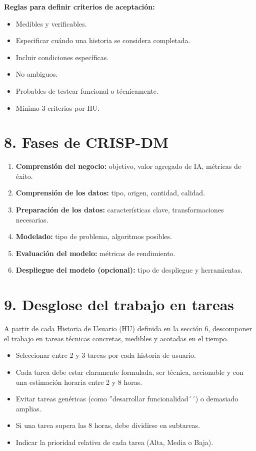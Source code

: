 \documentclass[
11pt, %
]{charter}
\begin{document}
\textbf{Reglas para definir criterios de aceptación:}
\begin{itemize}
  \item Medibles y verificables.
  \item Especificar cuándo una historia se considera completada.
  \item Incluir condiciones específicas.
  \item No ambiguos.
  \item Probables de testear funcional o técnicamente.
  \item Mínimo 3 criterios por HU.
\end{itemize}

\section{8. Fases de CRISP-DM}

\begin{enumerate}
  \item \textbf{Comprensión del negocio:} objetivo, valor agregado de IA, métricas de éxito.
  \item \textbf{Comprensión de los datos:} tipo, origen, cantidad, calidad.
  \item \textbf{Preparación de los datos:} características clave, transformaciones necesarias.
  \item \textbf{Modelado:} tipo de problema, algoritmos posibles.
  \item \textbf{Evaluación del modelo:} métricas de rendimiento.
  \item \textbf{Despliegue del modelo (opcional):} tipo de despliegue y herramientas.
\end{enumerate}

\section{9. Desglose del trabajo en tareas}
\label{sec:wbs}

A partir de cada Historia de Usuario (HU) definida en la sección 6, descomponer el trabajo en tareas técnicas concretas, medibles y acotadas en el tiempo.

\begin{itemize}
\item Seleccionar entre 2 y 3 tareas por cada historia de usuario.
\item Cada tarea debe estar claramente formulada, ser técnica, accionable y con una estimación horaria entre 2 y 8 horas.
\item Evitar tareas genéricas (como ''desarrollar funcionalidad´´) o demasiado amplias.
\item Si una tarea supera las 8 horas, debe dividirse en subtareas.
\item Indicar la prioridad relativa de cada tarea (Alta, Media o Baja).
\end{itemize}
\end{document}

